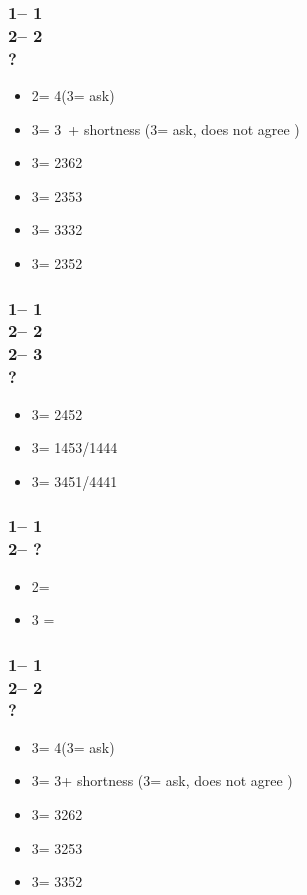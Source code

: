 \documentclass[12pt, a4paper]{report}
\begin{document}
{    \subsubsection*{1\diams -- 1\hearts\\
                    2\hearts -- 2\spades\\
                    ?}
    \begin{itemize}
        \item 2\nt = 4\hearts (3\clubs = ask)
        \item 3\clubs = 3\hearts\ + shortness (3\diams = ask, does not agree \hearts)
        \item 3\diams = 2362
        \item 3\hearts = 2353
        \item 3\spades = 3332
        \item 3\nt = 2352
    \end{itemize}

    \subsubsection*{1\diams -- 1\hearts\\
                    2\hearts -- 2\spades\\
                    2\nt -- 3\clubs\\
                    ?}
    \begin{itemize}
        \item 3\diams = 2452
        \item 3\hearts = 1453/1444
        \item 3\spades = 3451/4441
    \end{itemize}

    \subsubsection*{1\diams -- 1\spades\\
                    2\spades -- ?}
    \begin{itemize}
        \item 2\nt = \gf
        \item 3 = \inv
    \end{itemize}

    \subsubsection*{1\diams -- 1\spades\\
                    2\spades -- 2\nt\\
                    ?}
    \begin{itemize}
        \item 3\clubs = 4\spades (3\diams = ask)
        \item 3\diams = 3\spades + shortness (3\hearts = ask, does not agree \spades)
        \item 3\hearts = 3262
        \item 3\spades = 3253
        \item 3\nt = 3352
    \end{itemize}

}
\end{document}
